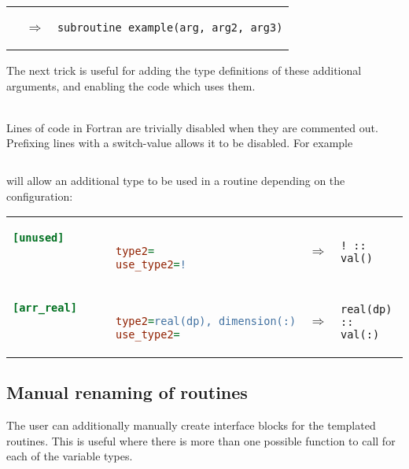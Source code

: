 \documentclass[a4paper,notitlepage]{scrreprt}
\newcommand\headitem[1]{\needspace{1.5\baselineskip}\item[{\boldmath #1 \nopagebreak}] \hfill \\ \nopagebreak}
\begin{document}
{{\begin{description}
\begin{minipage}{\textwidth}
\begin{tabular}{lcl}
			& $\Longrightarrow$ &
			\begin{lstlisting}[gobble=16]
				subroutine example(arg, arg2, arg3)
			\end{lstlisting}
			\end{tabular}
			\end{minipage}
			
			The next trick is useful for adding the type definitions of these
			additional arguments, and enabling the code which uses them.
		
		\headitem{Switching off lines of code}
			Lines of code in Fortran are trivially disabled when they are
			commented out. Prefixing lines with a switch-value allows it to be
			disabled. For example
			\begin{lstlisting}[gobble=12]
				%(use_type2)%(type2) :: val()
			\end{lstlisting}
			will allow an additional type to be used in a routine depending on
			the configuration:
			
			\begin{minipage}{\textwidth}
			\begin{tabular}{lcl}
			\begin{lstlisting}[language=ini,gobble=16]
				[unused]
				type2=
				use_type2=!
			\end{lstlisting}
			& $\Longrightarrow$ &
			\begin{lstlisting}[gobble=16]
				! :: val()
			\end{lstlisting} \\[1.5em]
		
			\begin{lstlisting}[language=ini,gobble=16]
				[arr_real]
				type2=real(dp), dimension(:)
				use_type2=
			\end{lstlisting}

			& $\Longrightarrow$ &
			\begin{lstlisting}[gobble=16]
				real(dp) :: val(:)
			\end{lstlisting}
			\end{tabular}
			\end{minipage}
	\end{description}


\subsection{Manual renaming of routines}	\label{sec:manualrenamingofroutines}
	The user can additionally manually create interface blocks for the
	templated routines. This is useful where there is more than one possible
	function to call for each of the variable types.
	
}}
\end{document}
